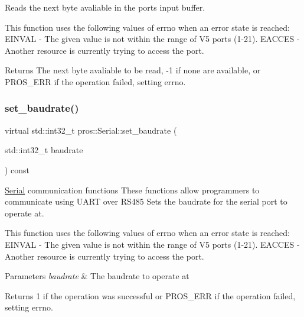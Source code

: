 Reads the next byte avaliable in the port\textquotesingle{}s input buffer.

This function uses the following values of errno when an error state is reached\+: E\+I\+N\+V\+AL -\/ The given value is not within the range of V5 ports (1-\/21). E\+A\+C\+C\+ES -\/ Another resource is currently trying to access the port.

\begin{DoxyReturn}{Returns}
The next byte avaliable to be read, -\/1 if none are available, or P\+R\+O\+S\+\_\+\+E\+RR if the operation failed, setting errno. 
\end{DoxyReturn}
\mbox{\label{classpros_1_1Serial_ab8c6d804852e6689d6c92c6b2c439824}} 
\subsubsection{\texorpdfstring{set\+\_\+baudrate()}{set\_baudrate()}}
{\footnotesize\ttfamily virtual std\+::int32\+\_\+t pros\+::\+Serial\+::set\+\_\+baudrate (\begin{DoxyParamCaption}\item[{std\+::int32\+\_\+t}]{baudrate }\end{DoxyParamCaption}) const\hspace{0.3cm}{\ttfamily [virtual]}}

\hyperlink{classpros_1_1Serial}{Serial} communication functions These functions allow programmers to communicate using U\+A\+RT over R\+S485 Sets the baudrate for the serial port to operate at.

This function uses the following values of errno when an error state is reached\+: E\+I\+N\+V\+AL -\/ The given value is not within the range of V5 ports (1-\/21). E\+A\+C\+C\+ES -\/ Another resource is currently trying to access the port.


\begin{DoxyParams}{Parameters}
{\em baudrate} & The baudrate to operate at\\
\hline
\end{DoxyParams}
\begin{DoxyReturn}{Returns}
1 if the operation was successful or P\+R\+O\+S\+\_\+\+E\+RR if the operation failed, setting errno. 
\end{DoxyReturn}
\mbox{\label{classpros_1_1Serial_a865313d3b482d9ffdd380edc36273b24}} 
